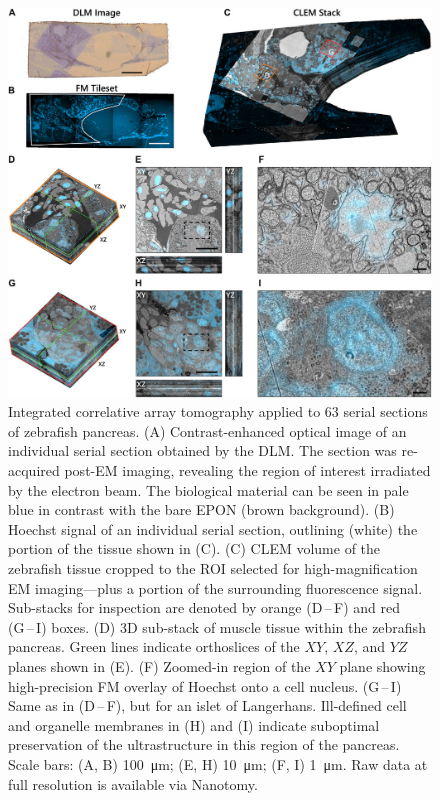 \begin{figure}[!tb]
    \centering
    \includegraphics[width=\linewidth]{chapter-3/figures_JPEG_LQ/fig3-6_zebrafish.jpg}
    \caption{Integrated correlative array tomography applied to 63 serial sections of zebrafish pancreas.
    (A) Contrast-enhanced optical image of an individual serial section obtained by the DLM. The section was re-acquired post-EM imaging, revealing the region of interest irradiated by the electron beam. The biological material can be seen in pale blue in contrast with the bare EPON (brown background).
    (B) Hoechst signal of an individual serial section, outlining (white) the portion of the tissue shown in (C).
    (C) CLEM volume of the zebrafish tissue cropped to the ROI selected for high-magnification EM imaging—plus a portion of the surrounding fluorescence signal. Sub-stacks for inspection are denoted by orange (D\,--\,F) and red (G\,--\,I) boxes.
    (D) 3D sub-stack of muscle tissue within the zebrafish pancreas. Green lines indicate orthoslices of the $XY$, $XZ$, and $YZ$ planes shown in (E).
    (F) Zoomed-in region of the $XY$ plane showing high-precision FM overlay of Hoechst onto a cell nucleus. (G\,--\,I) Same as in (D\,--\,F), but for an islet of Langerhans. Ill-defined cell and organelle membranes in (H) and (I) indicate suboptimal preservation of the ultrastructure in this region of the pancreas.
    Scale bars: (A, B) \SI{100}{\micro\meter}; (E, H) \SI{10}{\micro\meter}; (F, I) \SI{1}{\micro\meter}.
    Raw data at full resolution is available via Nanotomy.}
    \label{fig:3.6_zfpancreas}
\end{figure}

